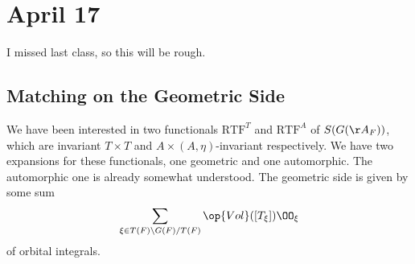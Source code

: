 \documentclass[../notes.tex]{subfiles}
\begin{document}
\section{April 17}
I missed last class, so this will be rough.

\subsection{Matching on the Geometric Side}
We have been interested in two functionals $\mathrm{RTF}^T$ and $\mathrm{RTF}^A$ of $S(G(\AA_F))$, which are invariant $T\times T$ and $A\times(A,\eta)$-invariant respectively. We have two expansions for these functionals, one geometric and one automorphic. The automorphic one is already somewhat understood. The geometric side is given by some sum
\[\sum_{\xi\in T(F)\backslash G(F)/T(F)}\op{Vol}([T_\xi])\OO_\xi\]
of orbital integrals.
\end{document}
